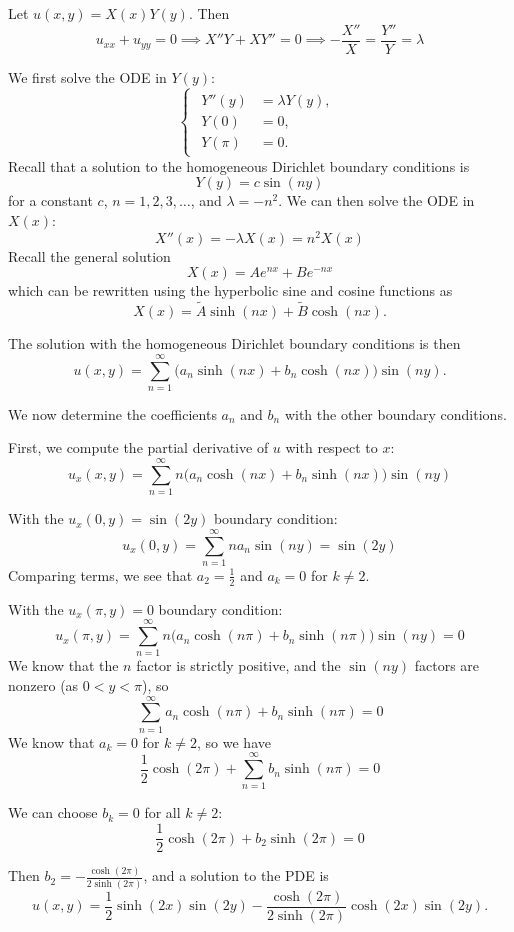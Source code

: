 \documentclass[plain]{pset}
\begin{document}
\begin{solution}
    Let \(u(x, y) = X(x)Y(y)\). Then
    \[u_{xx} + u_{yy} = 0 \implies X''Y + XY'' = 0 \implies -\frac{X''}{X} = \frac{Y''}{Y} = \lambda\]

    We first solve the ODE in \(Y(y)\):
    \[
        \begin{cases}
            \begin{aligned}
                Y''(y) & = \lambda Y(y), \\
                Y(0)   & = 0,            \\
                Y(\pi) & = 0.
            \end{aligned}
        \end{cases}
    \]
    Recall that a solution to the homogeneous Dirichlet boundary conditions is
    \[Y(y) = c \sin(ny)\]
    for a constant \(c\), \(n = 1, 2, 3, \ldots\), and \(\lambda = -n^2\). We can then solve the ODE in \(X(x)\):
    \[X''(x) = -\lambda X(x) = n^2 X(x)\]
    Recall the general solution
    \[X(x) = Ae^{nx} + Be^{-nx}\]
    which can be rewritten using the hyperbolic sine and cosine functions as
    \[X(x) = \tilde{A}\sinh(nx) + \tilde{B}\cosh(nx).\]

    The solution with the homogeneous Dirichlet boundary conditions is then
    \[u(x, y) = \sum_{n=1}^\infty \bigl(a_n\sinh(nx) + b_n\cosh(nx)\bigr)\sin(ny).\]

    We now determine the coefficients \(a_n\) and \(b_n\) with the other boundary conditions.

    First, we compute the partial derivative of \(u\) with respect to \(x\):
    \[u_x(x, y) = \sum_{n=1}^\infty n\bigl(a_n\cosh(nx) + b_n\sinh(nx)\bigr)\sin(ny)\]

    With the \(u_x(0, y) = \sin(2y)\) boundary condition:
    \[u_x(0, y) = \sum_{n=1}^\infty n a_n \sin(ny) = \sin(2y)\]
    Comparing terms, we see that \(a_2 = \frac{1}{2}\) and \(a_k = 0\) for \(k \neq 2\).

    With the \(u_x(\pi, y) = 0\) boundary condition:
    \[u_x(\pi, y) = \sum_{n=1}^\infty n\bigl(a_n\cosh(n\pi) + b_n\sinh(n\pi)\bigr)\sin(ny) = 0\]
    We know that the \(n\) factor is strictly positive, and the \(\sin(ny)\) factors are nonzero (as \(0 < y < \pi\)), so
    \[\sum_{n=1}^\infty a_n\cosh(n\pi) + b_n\sinh(n\pi) = 0\]
    We know that \(a_k = 0\) for \(k \neq 2\), so we have
    \[\frac{1}{2}\cosh(2\pi) + \sum_{n=1}^\infty b_n\sinh(n\pi) = 0\]

    We can choose \(b_k = 0\) for all \(k \neq 2\):
    \[\frac{1}{2}\cosh(2\pi) + b_2\sinh(2\pi) = 0\]

    Then \(b_2 = -\frac{\cosh(2\pi)}{2\sinh(2\pi)}\), and a solution to the PDE is
    \[u(x, y) = \frac{1}{2}\sinh(2x)\sin(2y) - \frac{\cosh(2\pi)}{2\sinh(2\pi)}\cosh(2x)\sin(2y).\]
\end{solution}
\end{document}

